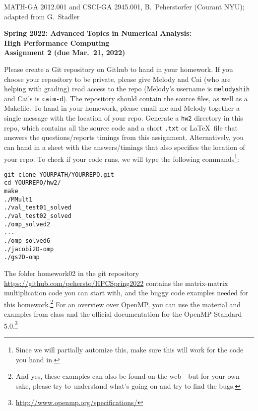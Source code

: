 \documentclass[12pt]{article}
\begin{document}
\begin{center}
  \vspace*{-2cm}
{\small MATH-GA 2012.001 and CSCI-GA 2945.001, B.~Peherstorfer (Courant NYU); adapted from G.~Stadler}\end{center}
\vspace*{.5cm}
\begin{center}
\large \textbf{%
Spring 2022: Advanced Topics in Numerical Analysis: \\
High Performance Computing \\
Assignment 2 (due Mar.\ 21, 2022) }
\end{center}



 Please create a Git
repository on Github  to hand in your homework.  If you
choose your repository to be private, please give Melody and Cai (who are helping with grading) read access to the repo (Melody's username is 
\texttt{melodyshih} and Cai's is \texttt{caim-d}).
The repository should contain the source
files, as well as a Makefile.
To hand in your homework, please email me and Melody together a
single message with the location of your repo. Generate a \texttt{hw2}
directory in this repo, which contains all the source code and a
short \texttt{.txt} or \LaTeX\ file that answers the questions/reports
timings from this assignment. Alternatively, you can hand in a sheet
with the answers/timings that also specifies the location of your
repo.  To check if your code runs, we will type the following
commands\footnote{Since we will partially automize this, make sure
  this will work for the code you hand in.}:
\begin{verbatim}
git clone YOURPATH/YOURREPO.git
cd YOURREPO/hw2/
make
./MMult1
./val_test01_solved
./val_test02_solved
./omp_solved2
...
./omp_solved6
./jacobi2D-omp
./gs2D-omp
\end{verbatim}
The folder homework02 in the git repository \url{https://github.com/pehersto/HPCSpring2022}
contains the matrix-matrix multiplication code you can start with, and
the buggy code examples needed for this homework.\footnote{And
  yes, these examples can also be found on the web---but for your own
  sake, please try to understand what's going on and try to find the
  bugs.} For an overview over OpenMP, you can use the material and
examples from class and the official documentation for the OpenMP
Standard
5.0.\footnote{\url{http://www.openmp.org/specifications/}}
\\[1ex]
\end{document}
